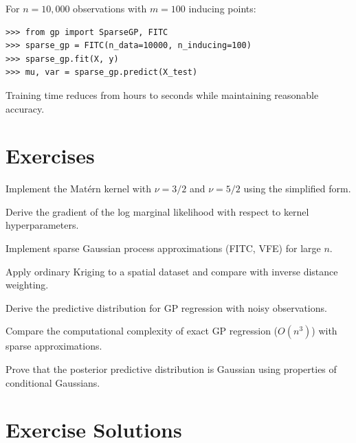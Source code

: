 \begin{example}
For $n = 10,000$ observations with $m = 100$ inducing points:
\begin{lstlisting}[style=python]
>>> from gp import SparseGP, FITC
>>> sparse_gp = FITC(n_data=10000, n_inducing=100)
>>> sparse_gp.fit(X, y)
>>> mu, var = sparse_gp.predict(X_test)
\end{lstlisting}
Training time reduces from hours to seconds while maintaining reasonable accuracy.
\end{example}

\section{Exercises}

\begin{exercise}
Implement the Matérn kernel with $\nu = 3/2$ and $\nu = 5/2$ using the simplified form.
\end{exercise}

\begin{exercise}
Derive the gradient of the log marginal likelihood  with respect to kernel hyperparameters.
\end{exercise}

\begin{exercise}
Implement sparse Gaussian process approximations (FITC, VFE) for large $n$.
\end{exercise}

\begin{exercise}
Apply ordinary Kriging to a spatial dataset and compare with inverse distance weighting.
\end{exercise}

\begin{exercise}
Derive the predictive distribution for GP regression with noisy observations.
\end{exercise}

\begin{exercise}
Compare the computational complexity of exact GP regression ($O(n^3)$) with sparse approximations.
\end{exercise}

\begin{exercise}
Prove that the posterior predictive distribution is Gaussian using properties of conditional Gaussians.
\end{exercise}


\section{Exercise Solutions}

